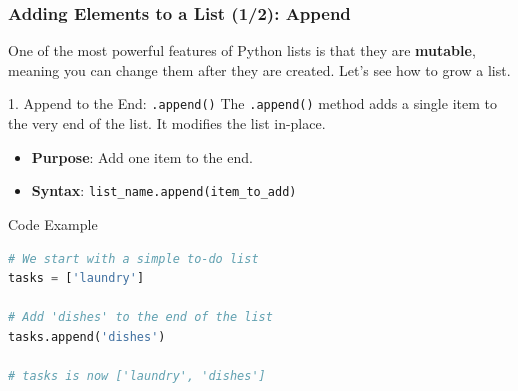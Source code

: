 \documentclass{beamer}
\begin{document}
\begin{frame}[fragile]
    \frametitle{Adding Elements to a List (1/2): Append}
    
    One of the most powerful features of Python lists is that they are \textbf{mutable}, meaning you can change them after they are created. Let's see how to grow a list.

    \begin{block}{1. Append to the End: \texttt{.append()}}
        The \texttt{.append()} method adds a single item to the very end of the list. It modifies the list in-place.
        \begin{itemize}
            \item \textbf{Purpose}: Add one item to the end.
            \item \textbf{Syntax}: \texttt{list\_name.append(item\_to\_add)}
        \end{itemize}
    \end{block}

    \pause

    \begin{exampleblock}{Code Example}
\begin{lstlisting}[language=Python]
# We start with a simple to-do list
tasks = ['laundry']

# Add 'dishes' to the end of the list
tasks.append('dishes')

# tasks is now ['laundry', 'dishes']
\end{lstlisting}
    \end{exampleblock}

\end{frame}
\end{document}
